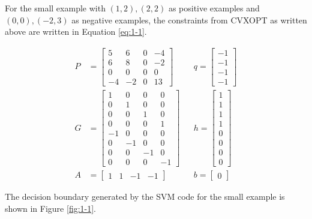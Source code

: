 \documentclass[10pt]{article}
\begin{document}
For the small example with $(1,2),(2,2)$ as positive examples and $(0,0),(-2,3)$ as negative examples, the constraints from CVXOPT as written above are written in Equation \ref{eq:1-1}.

\begin{subequations}
\begin{align*}
	P &= \begin{bmatrix}
		5 & 6 & 0 & -4 \\
		6 & 8 & 0 & -2 \\
		0 & 0 & 0 & 0 \\
		-4 & -2 & 0 & 13
	\end{bmatrix} 
	&& q = \begin{bmatrix}
		-1 \\ -1 \\ -1 \\ -1
	\end{bmatrix} \\
	G &= \begin{bmatrix}
		1 & 0 & 0 & 0 \\
		0 & 1 & 0 & 0 \\
		0 & 0 & 1 & 0 \\
		0 & 0 & 0 & 1 \\
		-1 & 0 & 0 & 0 \\
		0 & -1 & 0 & 0 \\
		0 & 0 & -1 & 0 \\
		0 & 0 & 0 & -1
	\end{bmatrix} 
	&& h = \begin{bmatrix}
		1 \\ 1 \\ 1\\ 1\\ 0\\ 0\\ 0\\ 0
	\end{bmatrix}\\
	A &= \begin{bmatrix}
		1 & 1 & -1 & -1	
	\end{bmatrix} 
	&& b = \begin{bmatrix}
		0
	\end{bmatrix}
\end{align*}
\label{eq:1-1}
\end{subequations}

The decision boundary generated by the SVM code for the small example is shown in Figure \ref{fig:1-1}.
\end{document}
